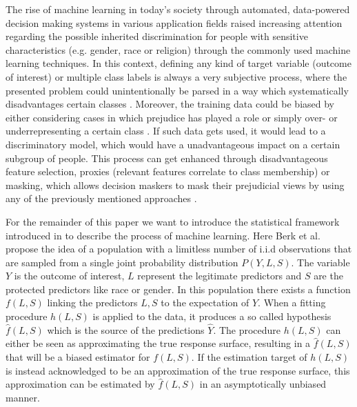 The rise of machine learning in today's society through automated, data-powered decision making systems in various application fields raised increasing attention regarding the possible inherited discrimination for people with sensitive characteristics (e.g. gender, race or religion) through the commonly used machine learning techniques.
In this context, defining any kind of target variable (outcome of interest) or multiple class labels is always a very subjective process, where 
the presented problem could unintentionally be parsed in a way which systematically disadvantages 
certain classes \cite{Barocas.2016, barocas-hardt-narayanan}. Moreover, the training data could be biased by 
either considering cases in which prejudice has played a role or simply over- or underrepresenting 
a certain class \cite{Barocas.2016, barocas-hardt-narayanan}. If such data gets used, it would lead to a discriminatory model, which would have a unadvantageous impact on a certain subgroup of people. This process can get enhanced through disadvantageous feature selection, proxies (relevant features correlate to class membership) or masking, which allows decision maskers to mask their prejudicial views by using any of the previously mentioned approaches \cite{Barocas.2016, barocas-hardt-narayanan}.  

For the remainder of this paper we want to introduce the statistical framework introduced in \cite{Berk.2018} to describe the process of machine learning. Here Berk et al. propose the idea of a population with a limitless number of i.i.d observations that are sampled from a single joint probability distribution $P(Y,L,S)$. 
The variable $Y$ is the outcome of interest, $L$ represent the legitimate predictors and $S$ are the 
protected predictors like race or gender. In this population there exists a function $f(L,S)$ 
linking the predictors $L,S$ to the expectation of $Y$. When a fitting procedure $h(L,S)$ 
is applied to the data, it produces a so called hypothesis $\hat{f}(L,S)$ which is the 
source of the predictions $\hat{Y}$. The procedure $h(L,S)$ can either be seen as 
approximating the true response surface, resulting in a $\hat{f}(L,S)$ that will be a biased 
estimator for $f(L,S)$. If the estimation target of $h(L,S)$ is instead acknowledged to be 
an approximation of the true response surface, this approximation can be estimated by 
$\hat{f}(L,S)$ in an asymptotically unbiased manner.